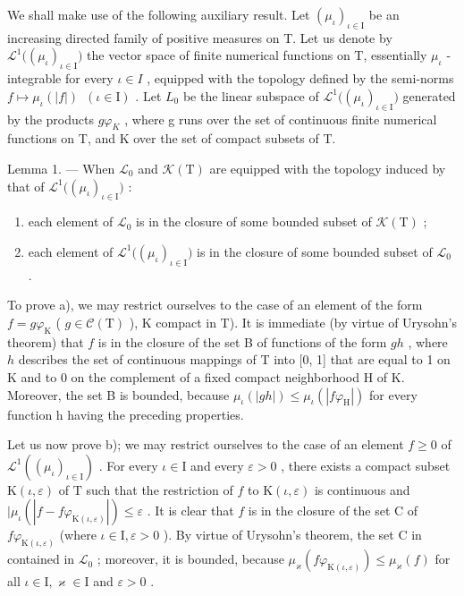 We shall make use of the following auxiliary result. Let \((\mu_{\iota})_{\iota\in\mathrm{I}}\) be an increasing directed family of positive measures on T. Let us denote by \(\mathcal{L}^{1}\big((\mu_{\iota})_{\iota\in\mathrm{I}}\big)\) the vector space of finite numerical functions on T, essentially \(\mu_{\iota}\) -integrable for every \(\iota\in I\) , equipped with the topology defined by the semi-norms \(f\mapsto\mu_{\iota}(|f|)\;\ (\iota\in\mathrm{I})\) . Let \(L_{0}\) be the linear subspace of \(\mathcal{L}^{1}\big((\mu_{\iota})_{\iota\in\mathrm{I}}\big)\) generated by the products \(g\varphi_{K}\) , where g runs over the set of continuous finite numerical functions on T, and K over the set of compact subsets of T.

Lemma 1. --- When \(\mathcal{L}_0\) and \(\mathcal{K}(\mathrm{T})\) are equipped with the topology induced by that of \(\mathcal{L}^1\big((\mu_\iota)_{\iota \in \mathrm{I}}\big)\) :

\begin{enumerate}
\def\labelenumi{\alph{enumi})}
\item
  each element of \(\mathcal{L}_0\) is in the closure of some bounded subset of \(\mathcal{K}(\mathrm{T})\) ;
\item
  each element of \(\mathcal{L}^1\big((\mu_\iota)_{\iota \in \mathrm{I}}\big)\) is in the closure of some bounded subset of \(\mathcal{L}_0\) .
\end{enumerate}

To prove a), we may restrict ourselves to the case of an element of the form \(f = g\varphi_{\mathrm{K}}\) ( \(g \in \mathcal{C}(\mathrm{T})\) ), K compact in T). It is immediate (by virtue of Urysohn's theorem) that \(f\) is in the closure of the set B of functions of the form \(gh\) , where \(h\) describes the set of continuous mappings of T into {[}0, 1{]} that are equal to 1 on K and to 0 on the complement of a fixed compact neighborhood H of K. Moreover, the set B is bounded, because \(\mu_{\iota}(|gh|) \leqslant \mu_{\iota}(|f\varphi_{\mathrm{H}}|)\) for every function h having the preceding properties.

Let us now prove b); we may restrict ourselves to the case of an element \(f \geqslant 0\) of \(\mathcal{L}^1((\mu_\iota)_{\iota \in \mathrm{I}})\) . For every \(\iota \in \mathrm{I}\) and every \(\varepsilon > 0\) , there exists a compact subset \(\mathrm{K}(\iota, \varepsilon)\) of \(\mathrm{T}\) such that the restriction of \(f\) to \(\mathrm{K}(\iota, \varepsilon)\) is continuous and \(|\mu_\iota(|f - f\varphi_{\mathrm{K}(\iota, \varepsilon)}|) \leqslant \varepsilon\) . It is clear that \(f\) is in the closure of the set \(\mathrm{C}\) of \(f\varphi_{\mathrm{K}(\iota, \varepsilon)}\) (where \(\iota \in \mathrm{I}, \varepsilon > 0\) ). By virtue of Urysohn's theorem, the set \(\mathrm{C}\) in contained in \(\mathcal{L}_0\) ; moreover, it is bounded, because \(\mu_\varkappa(f\varphi_{\mathrm{K}(\iota, \varepsilon)}) \leqslant \mu_\varkappa(f)\) for all \(\iota \in \mathrm{I}, \varkappa \in \mathrm{I}\) and \(\varepsilon > 0\) .

